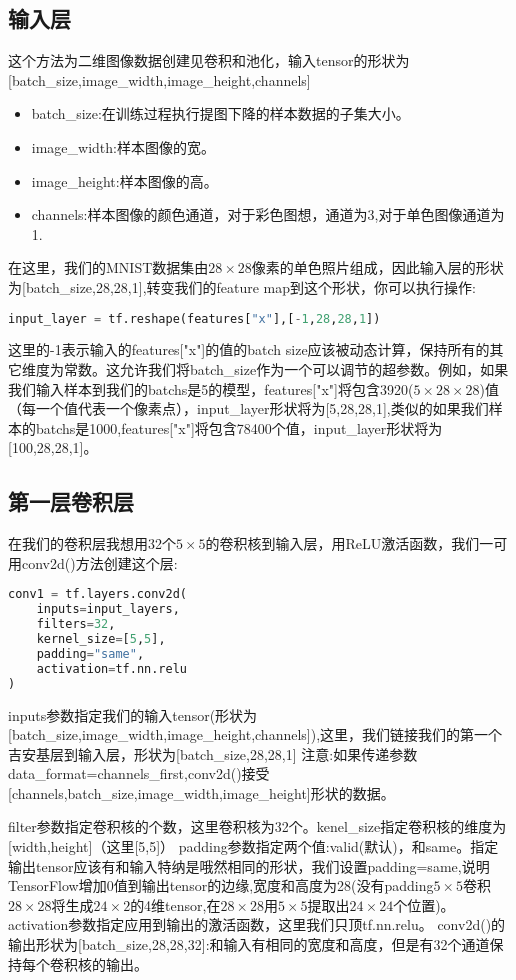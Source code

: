\subsection{输入层}
 这个方法为二维图像数据创建见卷积和池化，输入tensor的形状为[batch\_size,image\_width,image\_height,channels]
\begin{itemize}
\item batch\_size:在训练过程执行提图下降的样本数据的子集大小。
\item image\_width:样本图像的宽。
\item image\_height:样本图像的高。
\item channels:样本图像的颜色通道，对于彩色图想，通道为3,对于单色图像通道为1.
\end{itemize}
在这里，我们的MNIST数据集由$28\times28$像素的单色照片组成，因此输入层的形状为[batch\_size,28,28,1],转变我们的feature map到这个形状，你可以执行操作:
\begin{lstlisting}[language=Python]
input_layer = tf.reshape(features["x"],[-1,28,28,1])
\end{lstlisting}
这里的-1表示输入的features["x"]的值的batch size应该被动态计算，保持所有的其它维度为常数。这允许我们将batch\_size作为一个可以调节的超参数。例如，如果我们输入样本到我们的batchs是5的模型，features["x"]将包含3920($5\times28\times28$)值（每一个值代表一个像素点），input\_layer形状将为[5,28,28,1],类似的如果我们样本的batchs是1000,features["x"]将包含78400个值，input\_layer形状将为[100,28,28,1]。
\subsection{第一层卷积层}
在我们的卷积层我想用32个$5\times5$的卷积核到输入层，用ReLU激活函数，我们一可用conv2d()方法创建这个层:
\begin{lstlisting}[language=Python]
conv1 = tf.layers.conv2d(
    inputs=input_layers,
    filters=32,
    kernel_size=[5,5],
    padding="same",
    activation=tf.nn.relu
)
\end{lstlisting}
\begin{displayquote}
inputs参数指定我们的输入tensor(形状为[batch\_size,image\_width,image\_height,channels]),这里，我们链接我们的第一个吉安基层到输入层，形状为[batch\_size,28,28,1]
注意:如果传递参数data\_format=channels\_first,conv2d()接受[channels,batch\_size,image\_width,image\_height]形状的数据。
\end{displayquote}
filter参数指定卷积核的个数，这里卷积核为32个。kenel\_size指定卷积核的维度为[width,height]（这里[5,5]）
padding参数指定两个值:valid(默认)，和same。指定输出tensor应该有和输入特纳是哦然相同的形状，我们设置padding=same,说明TensorFlow增加0值到输出tensor的边缘,宽度和高度为28(没有padding$5\times5$卷积$28\times28$将生成$24\times2$的4维tensor,在$28\times28$用$5\times5$提取出$24\times24$个位置)。
activation参数指定应用到输出的激活函数，这里我们只顶tf.nn.relu。
conv2d()的输出形状为[batch\_size,28,28,32]:和输入有相同的宽度和高度，但是有32个通道保持每个卷积核的输出。

